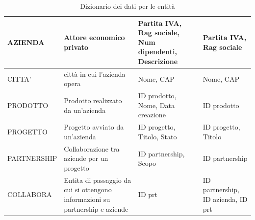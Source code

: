 \documentclass{article}
\begin{document}
\begin{table}[h!]
{\begin{tabular}{|l|p{4cm}|p{6cm}|p{3cm}|}
    \hline
    AZIENDA & Attore economico privato & Partita IVA, Rag sociale, Num dipendenti, Descrizione & Partita IVA, Rag sociale \\
    \hline
    CITTA' & città in cui l'azienda opera & Nome, CAP & Nome, CAP \\
    \hline
    PRODOTTO & Prodotto realizzato da un'azienda & ID prodotto, Nome, Data creazione & ID prodotto \\
    \hline
    PROGETTO & Progetto avviato da un'azienda & ID progetto, Titolo, Stato & ID progetto, Titolo \\
    \hline
    PARTNERSHIP & Collaborazione tra aziende per un progetto & ID partnership, Scopo & ID partnership \\
    \hline
    COLLABORA & Entita di passaggio da cui si ottengono informazioni su partnership e aziende & ID prt & ID partnership, ID azienda, ID prt \\
    \hline
    \end{tabular}%
    }
    \caption{Dizionario dei dati per le entità}
\end{table}
\end{document}
